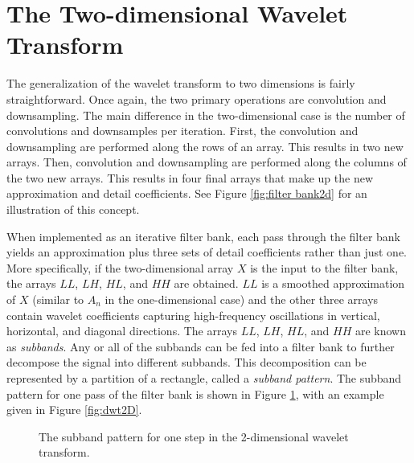 \section*{The Two-dimensional Wavelet Transform} %

The generalization of the wavelet transform to two dimensions is fairly straightforward.
Once again, the two primary operations are convolution and downsampling.
The main difference in the two-dimensional case is the number of convolutions and downsamples per iteration.
First, the convolution and downsampling are performed along the rows of an array.
This results in two new arrays.
Then, convolution and downsampling are performed along the columns of the two new arrays.
This results in four final arrays that make up the new approximation and detail coefficients.
See Figure \ref{fig:filter bank2d} for an illustration of this concept.

When implemented as an iterative filter bank, each pass through the filter bank yields an approximation plus three sets of detail coefficients rather than just one.
More specifically, if the two-dimensional array $X$ is the input to the filter bank, the arrays $LL$, $LH$, $HL$, and $HH$ are obtained.
$LL$ is a smoothed approximation of $X$ (similar to $A_n$ in the one-dimensional case) and the other three arrays contain wavelet coefficients capturing high-frequency oscillations in
vertical, horizontal, and diagonal directions.
The arrays $LL$, $LH$, $HL$, and $HH$ are known as \emph{subbands}.
Any or all of the subbands can be fed into a filter bank to further decompose the signal into different subbands.
This decomposition can be represented by a partition of a rectangle, called a \emph{subband pattern}.
The subband pattern for one pass of the filter bank is shown in Figure \ref{fig:2dsubbands}, with an example given in Figure \ref{fig:dwt2D}.

\begin{figure}[H]
\caption{The subband pattern for one step in the 2-dimensional wavelet transform.}
\label{fig:2dsubbands}
\end{figure}

